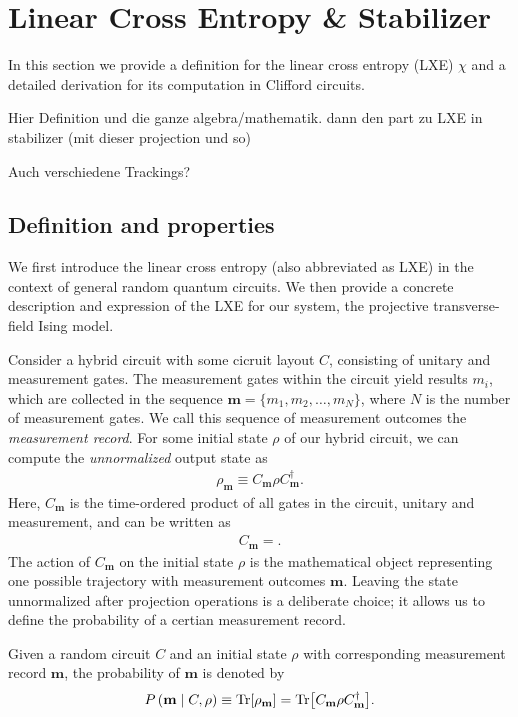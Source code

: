\section{Linear Cross Entropy \& Stabilizer}
In this section we provide a definition for the linear cross entropy (LXE)
$\chi$ and a detailed derivation for its computation in Clifford circuits.

Hier Definition und die ganze algebra/mathematik. dann den part zu LXE in
stabilizer (mit dieser projection und so)

Auch verschiedene Trackings?

\subsection{Definition and properties}
We first introduce the linear cross entropy (also abbreviated as LXE) in the
context of general random quantum circuits. We then provide a concrete
description and expression of the LXE for our system, the projective
transverse-field Ising model.

Consider a hybrid circuit with some cicruit layout $C$, consisting of unitary
and measurement gates. The measurement gates within the circuit yield results
$m_i$, which are collected in the sequence $\mathbf{m} = \{m_1, m_2, \ldots,
m_N\}$, where $N$ is the number of measurement gates. We call this sequence of
measurement outcomes the \emph{measurement record}. For some initial state
$\rho$ of our hybrid circuit, we can compute the \emph{unnormalized} output
state as
\begin{align}\label{eq:rho-m}
  \rho_\mathbf{m} \equiv C_\mathbf{m} \rho C^\dagger_\mathbf{m}
.\end{align}
Here, $C_\mathbf{m}$ is the time-ordered product of all gates in the circuit,
unitary and measurement, and can be written as
\begin{align}
  C_\mathbf{m} = 
.\end{align}
The action of $C_\mathbf{m}$ on the initial state
$\rho$ is the mathematical object representing one possible trajectory with
measurement outcomes $\mathbf{m}$. Leaving the state unnormalized after 
projection operations is a deliberate choice; it allows us to define the
probability of a certian measurement record.

\begin{defn}\label{defn:prob-traj}
  Given a random circuit $C$ and an initial state $\rho$ with corresponding
  measurement record $\mathbf{m}$, the probability of $\mathbf{m}$ is denoted
  by
  \begin{align}
    P\left( \mathbf{m} \mid C, \rho \right) \equiv \Tr[\rho_\mathbf{m}] =
    \Tr[C_\mathbf{m} \rho C^\dagger_\mathbf{m}]
  .\end{align}
\end{defn}

